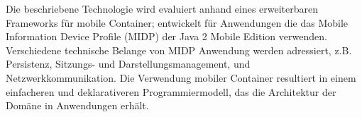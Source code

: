 Die beschriebene Technologie wird evaluiert anhand eines erweiterbaren
Frameworks f\"{u}r mobile Container; entwickelt  f\"{u}r  Anwendungen die das Mobile Information Device Profile (MIDP) der Java 2 Mobile Edition verwenden.
Verschiedene technische Belange von MIDP Anwendung werden adressiert, z.B.  
Persistenz, Sitzungs- und Darstellungsmanagement, und Netzwerkkommunikation. Die Verwendung mobiler Container resultiert in einem einfacheren und deklarativeren Programmiermodell, das die Architektur der Dom\"{a}ne in Anwendungen erh\"{a}lt.
